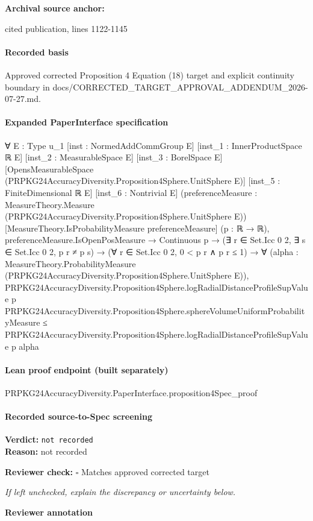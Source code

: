 \documentclass[10pt]{article}
\newcommand{\reviewerbox}{%
  \par\noindent\fbox{\parbox{0.96\linewidth}{\rule{0pt}{0.38in}}}\par
}
\newcommand{\reviewmatch}[1]{%
  \par\noindent\textbf{Reviewer check:} $\square$\; #1\par
  \noindent\emph{If left unchecked, explain the discrepancy or uncertainty below.}\par
}
\begin{document}
\textbf{Archival source anchor:} {\footnotesize\raggedright cited publication, lines 1122-\allowbreak{}1145\par}
\paragraph{Recorded basis}
Approved corrected Proposition 4 Equation (18) target and explicit continuity boundary in docs/\allowbreak{}CORRECTED\_\allowbreak{}TARGET\_\allowbreak{}APPROVAL\_\allowbreak{}ADDENDUM\_\allowbreak{}2026-\allowbreak{}07-\allowbreak{}27.\allowbreak{}md.\allowbreak{}
\paragraph{Expanded PaperInterface specification}
\begin{ReviewVerbatim}
∀ {E : Type u_1} [inst : NormedAddCommGroup E] [inst_1 : InnerProductSpace ℝ E] [inst_2 : MeasurableSpace E]
  [inst_3 : BorelSpace E] [OpensMeasurableSpace (PRPKG24AccuracyDiversity.Proposition4Sphere.UnitSphere E)]
  [inst_5 : FiniteDimensional ℝ E] [inst_6 : Nontrivial E]
  (preferenceMeasure : MeasureTheory.Measure (PRPKG24AccuracyDiversity.Proposition4Sphere.UnitSphere E))
  [MeasureTheory.IsProbabilityMeasure preferenceMeasure] (p : ℝ → ℝ),
  preferenceMeasure.IsOpenPosMeasure →
    Continuous p →
      (∃ r ∈ Set.Icc 0 2, ∃ s ∈ Set.Icc 0 2, p r ≠ p s) →
        (∀ r ∈ Set.Icc 0 2, 0 < p r ∧ p r ≤ 1) →
          ∀ (alpha : MeasureTheory.ProbabilityMeasure (PRPKG24AccuracyDiversity.Proposition4Sphere.UnitSphere E)),
            PRPKG24AccuracyDiversity.Proposition4Sphere.logRadialDistanceProfileSupValue p
                PRPKG24AccuracyDiversity.Proposition4Sphere.sphereVolumeUniformProbabilityMeasure ≤
              PRPKG24AccuracyDiversity.Proposition4Sphere.logRadialDistanceProfileSupValue p alpha
\end{ReviewVerbatim}

\paragraph{Lean proof endpoint (built separately)}\begin{ReviewVerbatim}
PRPKG24AccuracyDiversity.PaperInterface.proposition4Spec_proof
\end{ReviewVerbatim}

\paragraph{Recorded source-to-Spec screening}
\textbf{Verdict:} \texttt{not recorded}
\\
\textbf{Reason:} not recorded
\reviewmatch{Matches approved corrected target}
\noindent\textbf{Reviewer annotation}\par
\reviewerbox
\clearpage
\hypertarget{source-claim-fa631b15a4a1176a}{}
\end{document}
